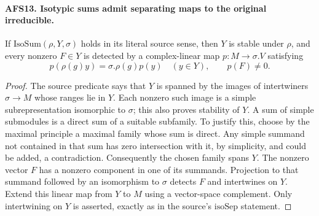 \documentclass[11pt,a4paper]{article}
\numberwithin{equation}{section}
\theoremstyle{remark}\newtheorem{remark}[theorem]{Remark}
\begin{document}
\paragraph{AFS13. Isotypic sums admit separating maps to the original irreducible.}
\label{claim:AFS13}
If $\mathrm{IsoSum}(\rho,Y,\sigma)$ holds in its literal
source sense, then $Y$ is stable under $\rho$, and every
nonzero $F\in Y$ is detected by a complex-linear map
$p:M\to\sigma.V$ satisfying
\[
 p(\rho(g)y)=\sigma.\rho(g)p(y)\quad(y\in Y),
                                  \qquad p(F)\ne0.
\]
\begin{proof}
The source predicate says that $Y$ is spanned by the images
of intertwiners $\sigma\to M$ whose ranges lie in $Y$.
Each nonzero such image is a simple subrepresentation
isomorphic to $\sigma$; this also proves stability of $Y$.
A sum of simple submodules is a direct sum of a suitable
subfamily.  To justify this, choose by the maximal principle
a maximal family whose sum is direct.  Any simple summand
not contained in that sum has zero intersection with it,
by simplicity, and could be added, a contradiction.
Consequently the chosen family spans $Y$.  The nonzero
vector $F$ has a nonzero component in one of its summands.
Projection to that summand followed by an isomorphism to
$\sigma$ detects $F$ and intertwines on $Y$.  Extend this
linear map from $Y$ to $M$ using a vector-space complement.
Only intertwining on $Y$ is asserted, exactly as in the
source's $\mathrm{isoSep}$ statement.
\end{proof}

\end{document}
